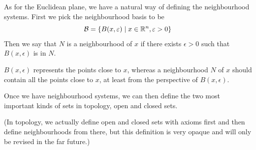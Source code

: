 As for the Euclidean plane, we have a natural way of defining the neighbourhood systems. First we pick the neighbourhood basis to be
\[ \mathcal{B} = \{B(x,\varepsilon) \mid x\in\mathbb R^n,\varepsilon>0\} \]
Then we say that $N$ is a neighbourhood of $x$ if there exists $\epsilon>0$ such that $B(x,\epsilon)$ is in $N$.

$B(x,\epsilon)$ represents the points close to $x$, whereas a neighbourhood $N$ of $x$ should contain all the points close to $x$, at least from the perspective of $B(x,\epsilon)$.

Once we have neighbourhood systems, we can then define the two most important kinds of sets in topology, open and closed sets.

(In topology, we actually define open and closed sets with axioms first and then define neighbourhoods from there, but this definition is very opaque and will only be revised in the far future.)

